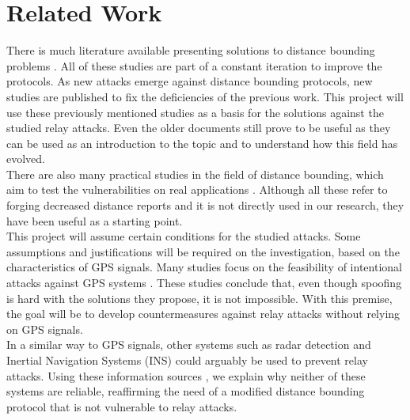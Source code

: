 \documentclass{article}
\begin{document}
\section{Related Work}
\label{sec:relatedwork}

There is much literature available presenting solutions to distance bounding problems \cite{brands1994distance, tu2007rfid, rasmussen2010realization}. All of these studies are part of a constant iteration to improve the protocols. As new attacks emerge against distance bounding protocols, new studies are published to fix the deficiencies of the previous work. This project will use these previously mentioned studies as a basis for the solutions against the studied relay attacks. Even the older documents still prove to be useful as they can be used as an introduction to the topic and to understand how this field has evolved.\\

There are also many practical studies in the field of distance bounding, which aim to test the vulnerabilities on real applications \cite{francillon2011relay, francis2010practical, hancke2005practical, markantonakis2012practical, vandenbreekel2014relay}. Although all these refer to forging decreased distance reports and it is not directly used in our research, they have been useful as a starting point.\\

This project will assume certain conditions for the studied attacks. Some assumptions and justifications will be required on the investigation, based on the characteristics of GPS signals. Many studies focus on the feasibility of intentional attacks against GPS systems \cite{warner2003gps, wen2005countermeasures, jafarnia2012gps}. These studies conclude that, even though spoofing is hard with the solutions they propose, it is not impossible. With this premise, the goal will be to develop countermeasures against relay attacks without relying on GPS signals.\\

In a similar way to GPS signals, other systems such as radar detection \cite{cadirci2009rf} and Inertial Navigation Systems (INS) \cite{patent:4085440} could arguably be used to prevent relay attacks. Using these information sources \cite{cadirci2009rf, patent:4085440}, we explain why neither of these systems are reliable, reaffirming the need of a modified distance bounding protocol that is not vulnerable to relay attacks.\\
\end{document}
